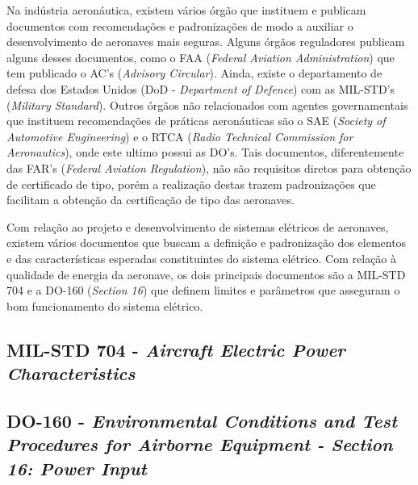 Na indústria aeronáutica, existem vários órgão que instituem e publicam documentos com recomendações e padronizações de modo a auxiliar o desenvolvimento de aeronaves mais seguras. Alguns órgãos reguladores publicam alguns desses documentos, como o FAA (\textit{Federal Aviation Administration}) que tem publicado o AC's (\textit{Advisory Circular}). Ainda, existe o departamento de defesa dos Estados Unidos (DoD - \textit{Department of Defence}) com as MIL-STD's (\textit{Military Standard}). Outros órgãos não relacionados com agentes governamentais que instituem recomendações de práticas aeronáuticas são o SAE (\textit{Society of Automotive Engineering}) e o RTCA (\textit{Radio Technical Commission for Aeronautics}), onde este ultimo possui as DO's. Tais documentos, diferentemente das FAR's (\textit{Federal Aviation Regulation}), não são requisitos diretos para obtenção de certificado de tipo, porém a realização destas trazem padronizações que facilitam a obtenção da certificação de tipo das aeronaves.

Com relação ao projeto e desenvolvimento de sistemas elétricos de aeronaves, existem vários documentos que buscam a definição e padronização dos elementos e das características esperadas constituintes do sistema elétrico. Com relação à qualidade de energia da aeronave, os dois principais documentos são a MIL-STD 704 e a DO-160 (\textit{Section 16}) que definem limites e parâmetros que asseguram o bom funcionamento do sistema elétrico.

\subsection{MIL-STD 704 - \textit{Aircraft Electric Power Characteristics}}

\subsection{DO-160 - \textit{Environmental Conditions and Test Procedures for Airborne Equipment - Section 16: Power Input}}
